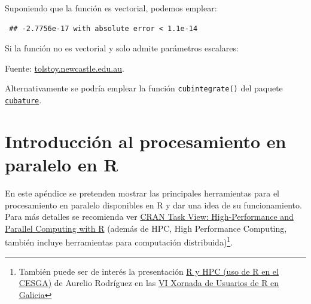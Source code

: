 \documentclass[
  spanish,
  10pt,
]{book}
\newenvironment{Shaded}{\begin{snugshade}}{\end{snugshade}}
\newcommand{\ControlFlowTok}[1]{\textcolor[rgb]{0.13,0.29,0.53}{\textbf{#1}}}
\newcommand{\FunctionTok}[1]{\textcolor[rgb]{0.13,0.29,0.53}{\textbf{#1}}}
\newcommand{\NormalTok}[1]{#1}
\newcommand{\SpecialCharTok}[1]{\textcolor[rgb]{0.81,0.36,0.00}{\textbf{#1}}}
\theoremstyle{break}
\theoremstyle{nonumberplain}
\let\oldfootnote\footnote
\renewcommand\footnote[1]{\oldfootnote{\hspace{2mm}#1}}
\begin{document}
Suponiendo que la función es vectorial, podemos emplear:

\begin{Shaded}
\end{Shaded}

\begin{verbatim}
 ## -2.7756e-17 with absolute error < 1.1e-14
\end{verbatim}

Si la función no es vectorial y solo admite parámetros escalares:

\begin{Shaded}
\end{Shaded}

Fuente: \href{http://tolstoy.newcastle.edu.au/R/help/04/10/5951.html}{tolstoy.newcastle.edu.au}.

Alternativamente se podría emplear la función \texttt{cubintegrate()} del paquete \href{https://bnaras.github.io/cubature/}{\texttt{cubature}}.

\chapter{Introducción al procesamiento en paralelo en R}\label{intro-hpc}

En este apéndice se pretenden mostrar las principales herramientas para el procesamiento en paralelo disponibles en R y dar una idea de su funcionamiento.
Para más detalles se recomienda ver \href{https://cran.r-project.org/view=HighPerformanceComputing}{CRAN Task View: High-Performance and Parallel Computing with R}
(además de HPC, High Performance Computing, también incluye herramientas para computación distribuida)\footnote{También puede ser de interés la presentación \href{https://www.r-users.gal/sites/default/files/10_aurelio_rodriguez.pdf}{R y HPC (uso de R en el CESGA)} de Aurelio Rodríguez en las \href{https://www.r-users.gal/pagina/programa-2018}{VI Xornada de Usuarios de R en Galicia}}.
\end{document}
